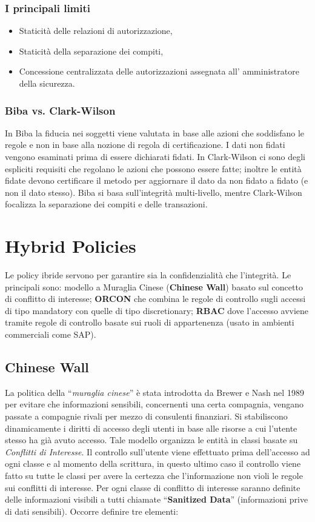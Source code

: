 \subsubsection{I principali limiti}
\begin{itemize}
      \item Staticità delle relazioni di autorizzazione,
      \item Staticità della separazione dei compiti,
      \item Concessione centralizzata delle autorizzazioni assegnata all'
            amministratore della sicurezza.
\end{itemize}

\subsubsection{Biba vs. Clark-Wilson}
In Biba la fiducia nei soggetti viene valutata in base alle azioni
che soddisfano le regole e non in base alla nozione di regola di certificazione.
I dati non fidati
vengono esaminati prima di essere dichiarati fidati. In Clark-Wilson ci sono
degli espliciti requisiti
che regolano le azioni che possono essere fatte; inoltre le entità fidate devono
certificare il metodo
per aggiornare il dato da non fidato a fidato (e non il dato stesso).
Biba si basa sull'integrità multi-livello, mentre Clark-Wilson focalizza la
separazione dei compiti e
delle transazioni.


\section{Hybrid Policies}

Le policy ibride servono per garantire sia la confidenzialità che l'integrità.
Le principali sono: modello a Muraglia Cinese (\textbf{Chinese Wall}) basato sul
concetto di conflitto di interesse; \textbf{ORCON} che combina le regole di
controllo sugli accessi di tipo mandatory con quelle di tipo discretionary;
\textbf{RBAC} dove l'accesso avviene tramite regole di controllo basate sui
ruoli di appartenenza (usato in ambienti commerciali come SAP).

\subsection{Chinese Wall}

La politica della “\textit{muraglia cinese}” è stata introdotta da Brewer e Nash
nel 1989 per evitare che informazioni sensibili, concernenti una certa compagnia,
vengano passate a compagnie rivali per mezzo di consulenti finanziari.
Si stabiliscono dinamicamente i diritti di accesso degli utenti in base
alle risorse a cui l'utente stesso ha già avuto accesso.
Tale modello organizza le entità in classi basate su \textit{Conflitti di Interesse}.
Il controllo sull'utente
viene effettuato prima dell'accesso ad ogni classe e al momento della scrittura,
in questo ultimo
caso il controllo viene fatto su tutte le classi per avere la certezza che
l'informazione non violi le
regole sui conflitti di interesse. Per ogni classe di conflitto di interesse
saranno definite delle
informazioni visibili a tutti chiamate “\textbf{Sanitized Data}”
(informazioni prive di dati sensibili).
Occorre definire tre elementi:

